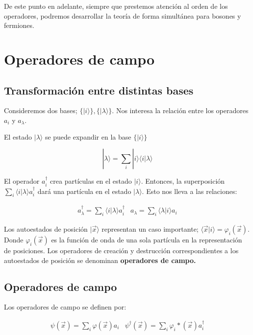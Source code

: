 \documentclass{article} %
\begin{document}
De este punto en adelante, siempre que prestemos atención al orden de los operadores, podremos desarrollar la teoría de forma simultánea para bosones y fermiones.

\section{Operadores de campo}

\subsection{Transformación entre distintas bases}

Consideremos dos bases; $\{ |i\rangle \}, \{ |\lambda\rangle\}$. Nos interesa la relación entre los operadores $a_i$ y $a_{\lambda}$.

El estado $|\lambda\rangle$ se puede expandir en la base $\{ |i\rangle \}$

$$
|\lambda\rangle = \sum_i |i\rangle\langle i|\lambda\rangle
$$

El operador $a_i^{\dagger}$ crea partículas en el estado $|i\rangle$. Entonces, la superposición $\sum_i \langle i | \lambda\rangle a_i^{\dagger}$ dará una partícula en el estado $|\lambda\rangle$. Esto nos lleva a las relaciones:

\begin{equation}
\begin{array}{cc}
a_{\lambda}^{\dagger} = \sum_i \langle i | \lambda \rangle a_i^{\dagger} & a_{\lambda} = \sum_i \langle \lambda | i \rangle a_i
\end{array}
\end{equation}

Los autoestados de posición $| \vec{x} \rangle$ representan un caso importante; $\langle \vec{x} | i \rangle = \varphi_i (\vec{x})$. Donde $\varphi_i (\vec{x})$ es la función de onda de una sola partícula en la representación de posiciones. Los operadores de creación y destrucción correspondientes a los autoestados de posición se denominan \textbf{operadores de campo.}

\subsection{Operadores de campo}

Los operadores de campo se definen por:

\begin{equation}
\begin{array}{cc}
\psi(\vec{x}) = \sum_i \varphi (\vec{x}) a_i & \psi^{\dagger} (\vec{x}) = \sum_i \varphi_i* (\vec{x}) a_i^{\dagger}
\end{array}
\label{eq:FieldOps}
\end{equation}
\end{document}
